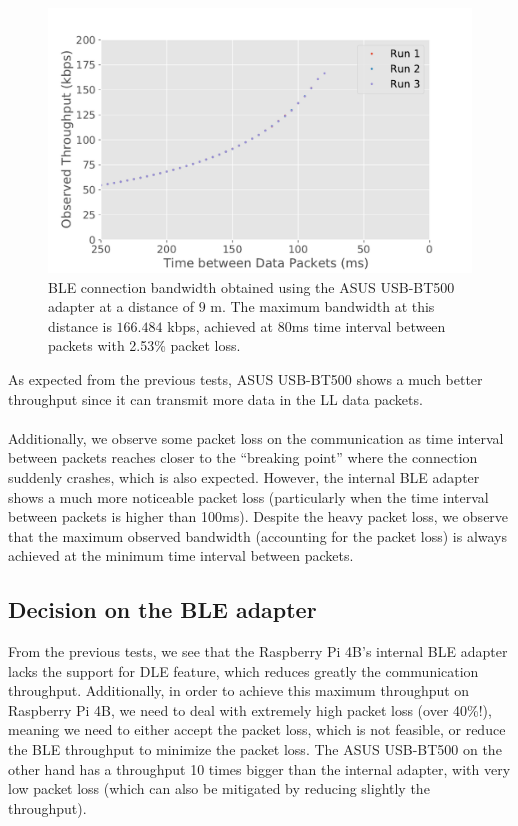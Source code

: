 \begin{figure}[H]
    \centering
    \includegraphics[width=0.75\linewidth]{images/ble-bandwidth-hci0-900cm.pdf}
    \caption[\acs{BLE} connection bandwidth obtained using the ASUS USB-BT500 adapter at a distance of 9 m.]{\acs{BLE} connection bandwidth obtained using the ASUS USB-BT500 adapter at a distance of $9\text{ m}$. The maximum bandwidth at this distance is $166.484$ kbps, achieved at 80ms time interval between packets with 2.53\% packet loss.}
    \label{fig:ble-bandwidth-hci0-9m}
\end{figure}

As expected from the previous tests, ASUS USB-BT500 shows a much better throughput since it can transmit more data in the \acs{LL} data packets. 

\paragraph{} Additionally, we observe some packet loss on the communication as time interval between packets reaches closer to the ``breaking point'' where the connection suddenly crashes, which is also expected. However, the internal \acs{BLE} adapter shows a much more noticeable packet loss (particularly when the time interval between packets is higher than 100ms). Despite the heavy packet loss, we observe that the maximum observed bandwidth (accounting for the packet loss) is always achieved at the minimum time interval between packets.

\subsection{Decision on the \acs{BLE} adapter}

From the previous tests, we see that the Raspberry Pi 4B's internal \acs{BLE} adapter lacks the support for \acs{DLE} feature, which reduces greatly the communication throughput. Additionally, in order to achieve this maximum throughput on Raspberry Pi 4B, we need to deal with extremely high packet loss (over 40\%!), meaning we need to either accept the packet loss, which is not feasible, or reduce the \acs{BLE} throughput to minimize the packet loss. The ASUS USB-BT500 on the other hand has a throughput 10 times bigger than the internal adapter, with very low packet loss (which can also be mitigated by reducing slightly the throughput).

